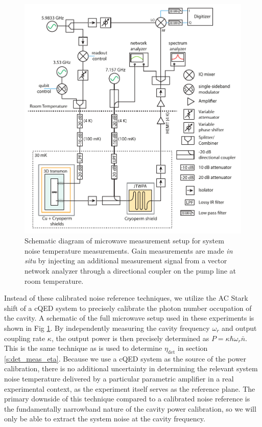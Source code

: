 \begin{figure}
\begin{center}
\includegraphics[width=5in]{twpa_exp/noise_schem.pdf}
\end{center}
\caption[Microwave measurement schematic for system noise measurement]{Schematic diagram of microwave measurement setup for system noise temperature measurements.  Gain measurements are made \textit{in situ} by injecting an additional measurement signal from a vector network analyzer through a directional coupler on the pump line at room temperature.}
\label{fig:noise_schem}
\end{figure}

Instead of these calibrated noise reference techniques, we utilize the AC Stark shift of a cQED system to precisely calibrate the photon number occupation of the cavity.  A schematic of the full microwave setup used in these experiments is shown in Fig \ref{fig:noise_schem}.  By independently measuring the cavity frequency $\omega_r$ and output coupling rate $\kappa$, the output power is then precisely determined as $P = \kappa \hbar \omega_r \bar{n}$.  This is the same technique as is used to determine $\eta_\mathrm{det}$ in section \ref{s:det_meas_eta}.  Because we use a cQED system as the source of the power calibration, there is no additional uncertainty in determining the relevant system noise temperature delivered by a particular parametric amplifier in a real experimental context, as the experiment itself serves as the reference plane.  The primary downside of this technique compared to a calibrated noise reference is the fundamentally narrowband nature of the cavity power calibration, so we will only be able to extract the system noise at the cavity frequency.

